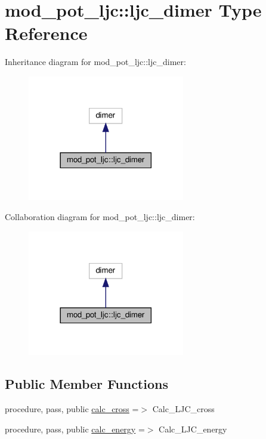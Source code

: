 \hypertarget{structmod__pot__ljc_1_1ljc__dimer}{}\section{mod\+\_\+pot\+\_\+ljc\+:\+:ljc\+\_\+dimer Type Reference}
\label{structmod__pot__ljc_1_1ljc__dimer}


Inheritance diagram for mod\+\_\+pot\+\_\+ljc\+:\+:ljc\+\_\+dimer\+:
\nopagebreak
\begin{figure}[H]
\begin{center}
\leavevmode
\includegraphics[width=194pt]{structmod__pot__ljc_1_1ljc__dimer__inherit__graph}
\end{center}
\end{figure}


Collaboration diagram for mod\+\_\+pot\+\_\+ljc\+:\+:ljc\+\_\+dimer\+:
\nopagebreak
\begin{figure}[H]
\begin{center}
\leavevmode
\includegraphics[width=194pt]{structmod__pot__ljc_1_1ljc__dimer__coll__graph}
\end{center}
\end{figure}
\subsection*{Public Member Functions}
\begin{DoxyCompactItemize}
\item 
procedure, pass, public \hyperlink{structmod__pot__ljc_1_1ljc__dimer_a11ff019bca3a0cfd88b8bc539639f7ed}{calc\+\_\+cross} =$>$ Calc\+\_\+\+L\+J\+C\+\_\+cross
\item 
procedure, pass, public \hyperlink{structmod__pot__ljc_1_1ljc__dimer_aa4866fab0965d1555ef216f65f03d1ee}{calc\+\_\+energy} =$>$ Calc\+\_\+\+L\+J\+C\+\_\+energy
\end{DoxyCompactItemize}
